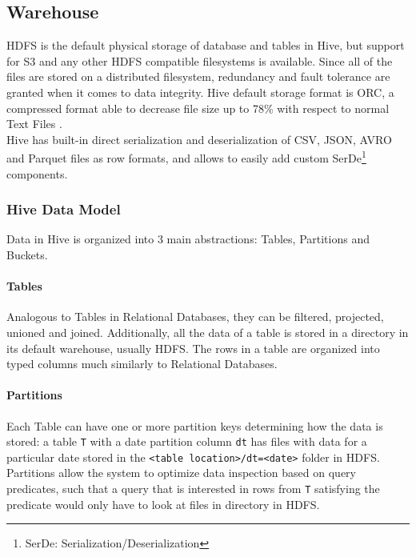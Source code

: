 \subsection{Warehouse}
HDFS is the default physical storage of database and tables in Hive, but support for S3 and any other HDFS compatible filesystems is available. Since all of the files are stored on a distributed filesystem, redundancy and fault tolerance are granted when it comes to data integrity. Hive default storage format is ORC, a compressed format able to decrease file size up to 78\% with respect to normal Text Files \cite{orc_format}.\\
Hive has built-in direct serialization and deserialization of CSV, JSON, AVRO and Parquet files as row formats, and allows to easily add custom SerDe\footnote{SerDe: Serialization/Deserialization} components.

\subsubsection{Hive Data Model}

Data in Hive is organized into 3 main abstractions: Tables, Partitions and Buckets.

\paragraph{Tables} Analogous to Tables in Relational Databases, they can be filtered, projected, unioned and joined. Additionally, all the data of a table is stored in a directory in its default warehouse, usually HDFS. The rows in a table are organized into typed columns much similarly to Relational Databases.
\paragraph{Partitions} Each Table can have one or more partition keys determining how the data is stored: a table \texttt{T} with a date partition column \texttt{dt} has files with data for a particular date stored in the \texttt{<table location>/dt=<date>} folder in HDFS. Partitions allow the system to optimize data inspection based on query predicates, such that a query that is interested in rows from \texttt{T} satisfying the predicate \texttt{} would only have to look at files in \texttt{} directory in HDFS.
